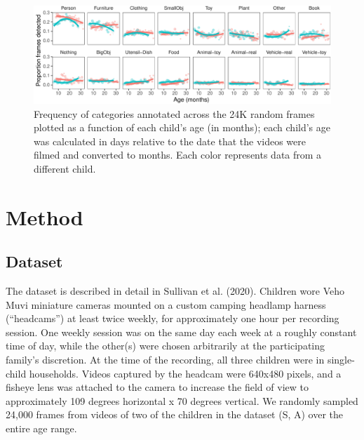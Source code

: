 \documentclass[10pt, letterpaper]{article}
\newenvironment{CodeChunk}{}{}
\begin{document}
\begin{CodeChunk}
\begin{figure}[h]

{\centering \includegraphics{figs/freq_by_category-1} 

}

\caption[Frequency of categories annotated across the 24K random frames plotted as a function of each child's age (in months)]{Frequency of categories annotated across the 24K random frames plotted as a function of each child's age (in months); each child's age was calculated in days relative to the date that the videos were filmed and converted to months. Each color represents data from a different child.}\label{fig:freq_by_category}
\end{figure}
\end{CodeChunk}

\hypertarget{method}{%
\section{Method}\label{method}}

\hypertarget{dataset}{%
\subsection{Dataset}\label{dataset}}

The dataset is described in detail in Sullivan et al. (2020). Children
wore Veho Muvi miniature cameras mounted on a custom camping headlamp
harness (``headcams'') at least twice weekly, for approximately one hour
per recording session. One weekly session was on the same day each week
at a roughly constant time of day, while the other(s) were chosen
arbitrarily at the participating family's discretion. At the time of the
recording, all three children were in single-child households. Videos
captured by the headcam were 640x480 pixels, and a fisheye lens was
attached to the camera to increase the field of view to approximately
109 degrees horizontal x 70 degrees vertical. We randomly sampled 24,000
frames from videos of two of the children in the dataset (S, A) over the
entire age range.
\end{document}
